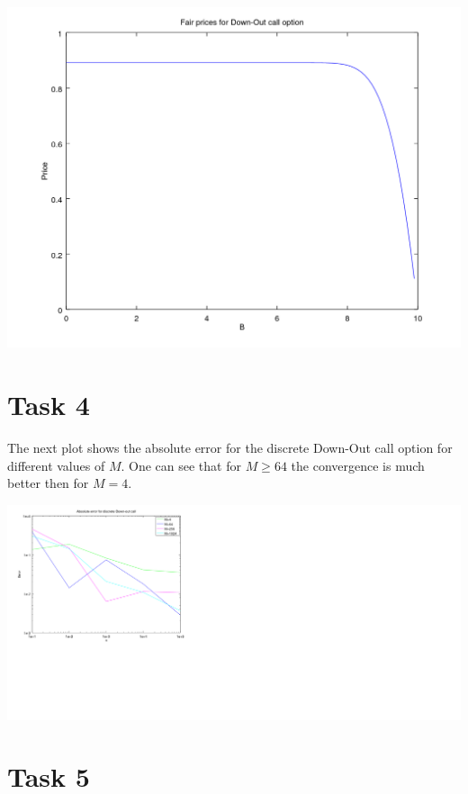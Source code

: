 \documentclass[10pt,a4paper]{article}
\begin{document}
\begin{center}
	\includegraphics[scale=0.5]{fair_prices_down_out_call.png}
\end{center}

\section*{Task 4}
The next plot shows the absolute error for the discrete Down-Out call option for different values of $M$. One can see that for $M\geq64$ the convergence is much better then for $M=4$.  

\begin{center}
	\includegraphics[scale=0.55]{convergence_plot_discrete_down_out_call.png}
\end{center}

\section*{Task 5}
\end{document}
